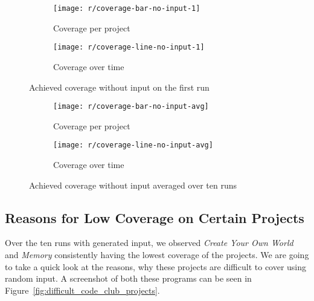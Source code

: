\begin{figure}[htpb]
    \centering
    \begin{subfigure}{.95\textwidth}
        \texttt{[image: r/coverage-bar-no-input-1]}
        \caption{Coverage per project}
        \label{fig:coverage_no_input_bar}
    \end{subfigure}

    \bigskip

    \begin{subfigure}{.95\textwidth}
        \texttt{[image: r/coverage-line-no-input-1]}
        \caption{Coverage over time}
        \label{fig:coverage_no_input_line}
    \end{subfigure}

    \caption{Achieved coverage without input on the first run}
    \label{fig:coverage_no_input}
\end{figure}

\begin{figure}[htpb]
    \centering
    \begin{subfigure}{.95\textwidth}
        \texttt{[image: r/coverage-bar-no-input-avg]}
        \caption{Coverage per project}
        \label{fig:coverage_no_input_bar_avg}
    \end{subfigure}

    \bigskip

    \begin{subfigure}{.95\textwidth}
        \texttt{[image: r/coverage-line-no-input-avg]}
        \caption{Coverage over time}
        \label{fig:coverage_no_input_line_avg}
    \end{subfigure}

    \caption{Achieved coverage without input averaged over ten runs}
    \label{fig:coverage_no_input_avg}
\end{figure}

\subsection{Reasons for Low Coverage on Certain Projects}

Over the ten runs with generated input, we observed \textit{Create Your Own World} and \textit{Memory} consistently having the lowest coverage of the projects.
We are going to take a quick look at the reasons, why these projects are difficult to cover using random input.
A screenshot of both these programs can be seen in Figure~\ref{fig:difficult_code_club_projects}.

